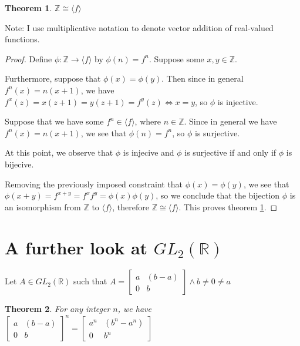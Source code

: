 \documentclass[12pt]{amsart}
\newcommand{\reals}{\mathbb{R}}
\newcommand{\ints}{\mathbb{Z}}
\newcommand{\gltwo}{GL_2(\reals)}
\newcommand{\glmatrix}[4]{\ensuremath{\begin{bmatrix} #1 & #2 \\ #3 & #4 \end{bmatrix}}}
\newtheorem{thm}{Theorem}
\begin{document}
\begin{thm} \label{thm8}
	$\ints \cong \langle f \rangle$
\end{thm}

Note: I use multiplicative notation to denote vector addition of real-valued functions.

\begin{proof}
	Define $\phi: \ints \to \langle f \rangle$
	by $\phi(n) = f^n$.
	Suppose some $x,y \in \ints$.
	
	Furthermore, suppose that $\phi(x) = \phi(y)$.
	Then since in general $f^n(x) = n(x + 1)$,
	we have $f^x(z) = x(z + 1) = y(z + 1) = f^y(z) \iff x = y$,
	so $\phi$ is injective.

	Suppose that we have some $f^n \in \langle f \rangle$,
	where $n \in \ints$.
	Since in general we have $f^n(x) = n(x + 1)$,
	we see that $\phi(n) = f^n$,
	so $\phi$ is surjective.

	At this point,
	we observe that
	$\phi$ is injecive
	and $\phi$ is surjective
	if and only if
	$\phi$ is bijecive.

	Removing the previously imposed constraint
	that $\phi(x) = \phi(y)$,
	we see that $\phi(x + y) = f^{x + y} = f^xf^y = \phi(x)\phi(y)$,
	so we conclude that the bijection $\phi$
	is an isomorphism from $\ints$ to $\langle f \rangle$,
	therefore $\ints \cong \langle f \rangle$.
	This proves theorem \ref{thm8}.
\end{proof}

\section{A further look at $\gltwo$}

Let $A \in \gltwo$ such that $A = \glmatrix{a}{(b-a)}{0}{b} \land b \neq 0 \neq a$

\begin{thm} \label{thm4}
	For any integer $n$, we have $\glmatrix{a}{(b-a)}{0}{b}^n = \glmatrix{a^n}{(b^n-a^n)}{0}{b^n}$
\end{thm}
\end{document}
